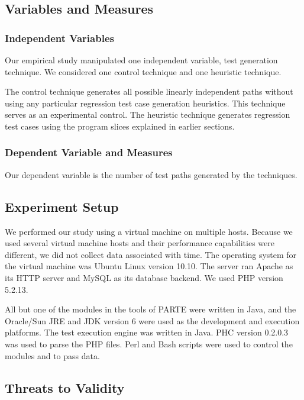 \subsection{Variables and Measures}
\label{sec:measures}

\subsubsection{Independent Variables}
\label{sec:independent}

Our empirical study manipulated one independent
variable, test generation technique.
We considered one control technique and one heuristic technique.

The control technique generates all possible linearly independent
paths without using any particular regression test case generation
heuristics. This technique serves as an experimental control.  
The heuristic technique generates regression test cases using
the program slices explained in earlier sections. 

\subsubsection{Dependent Variable and Measures}
\label{sec:dependent}

Our dependent variable is the number of test paths generated
by the techniques.

\subsection{Experiment Setup}
\label{sec:setup}

We performed our study using a virtual machine on multiple hosts. 
Because we used several virtual machine hosts and their performance 
capabilities were different, we did not collect data associated with 
time. The operating system for the virtual machine was 
Ubuntu Linux version 10.10. The server ran Apache as its HTTP 
server and MySQL as its database backend.
We used PHP version 5.2.13. 

All but one of the modules in the tools of PARTE were written in Java, 
and the Oracle/Sun JRE and JDK version 6 were used as the development 
and execution platforms. The test execution engine was written in Java. 
PHC version 0.2.0.3 was used to parse the PHP files. Perl and Bash 
scripts were used to control the modules and to pass data.

\subsection{Threats to Validity}
\label{sec:validity}
\vspace*{-3pt}

